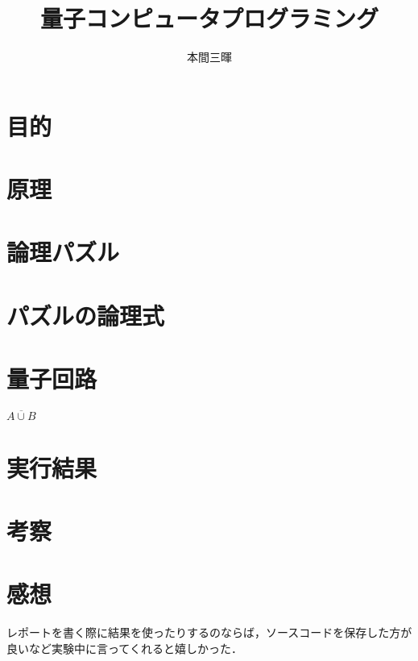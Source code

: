 \documentclass[titlepage,a4paper]{jsarticle}
\title{量子コンピュータプログラミング}
\author{本間三暉}
\begin{document}
\maketitle
\section{目的}

\section{原理}
\section{論理パズル}
\section{パズルの論理式}
\section{量子回路}
$\overline{A \cup B}$
\section{実行結果}
\section{考察}
\section{感想}
レポートを書く際に結果を使ったりするのならば，ソースコードを保存した方が良いなど実験中に言ってくれると嬉しかった．
\end{document}
